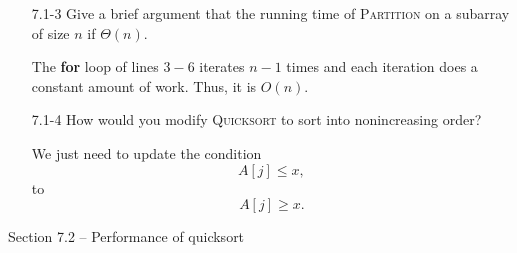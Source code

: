 \begin{enumerate}
\item[7.1{-}3]{Give a brief argument that the running time of \textsc{Partition}
on a subarray of size $n$ if $\Theta(n)$.}

\begin{framed}
The \textbf{for} loop of lines $3{-}6$ iterates $n - 1$ times and each
iteration does a constant amount of work. Thus, it is $O(n)$.
\end{framed}

\item[7.1{-}4]{How would you modify \textsc{Quicksort} to sort into
nonincreasing order?}

\begin{framed}
We just need to update the condition
\[
  A[j] \le x,
\]
to
\[
  A[j] \ge x.
\]
\end{framed}

\end{enumerate}

\newpage

{\large Section 7.2 {--} Performance of quicksort}

